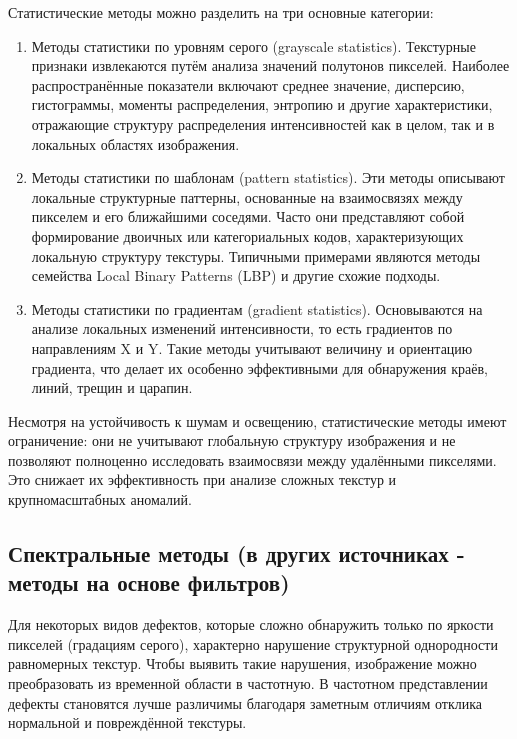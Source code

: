 \documentclass[14pt,a4paper]{article}
\begin{document}
Статистические методы можно разделить на три основные категории:
\begin{enumerate}
	\item Методы статистики по уровням серого (grayscale statistics). Текстурные признаки извлекаются путём анализа значений полутонов пикселей. Наиболее распространённые показатели включают среднее значение, дисперсию, гистограммы, моменты распределения, энтропию и другие характеристики, отражающие структуру распределения интенсивностей как в целом, так и в локальных областях изображения.
	\item Методы статистики по шаблонам (pattern statistics). Эти методы описывают локальные структурные паттерны, основанные на взаимосвязях между пикселем и его ближайшими соседями. Часто они представляют собой формирование двоичных или категориальных кодов, характеризующих локальную структуру текстуры. Типичными примерами являются методы семейства Local Binary Patterns (LBP) и другие схожие подходы.
	\item Методы статистики по градиентам (gradient statistics). Основываются на анализе локальных изменений интенсивности, то есть градиентов по направлениям X и Y. Такие методы учитывают величину и ориентацию градиента, что делает их особенно эффективными для обнаружения краёв, линий, трещин и царапин.
\end{enumerate}
Несмотря на устойчивость к шумам и освещению, статистические методы имеют ограничение: они не учитывают глобальную структуру изображения и не позволяют полноценно исследовать взаимосвязи между удалёнными пикселями. Это снижает их эффективность при анализе сложных текстур и крупномасштабных аномалий.

\subsection{Спектральные методы (в других источниках - методы на основе фильтров)} 
Для некоторых видов дефектов, которые сложно обнаружить только по яркости пикселей (градациям серого), характерно нарушение структурной однородности равномерных текстур. Чтобы выявить такие нарушения, изображение можно преобразовать из временной области в частотную. В частотном представлении дефекты становятся лучше различимы благодаря заметным отличиям отклика нормальной и повреждённой текстуры.
\end{document}
